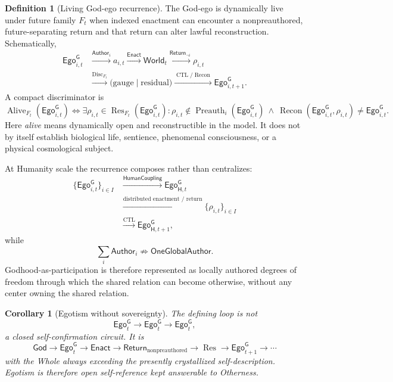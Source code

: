 \documentclass[10pt]{article}
\theoremstyle{pe}
\newtheorem{corollary}[theorem]{Corollary}
\theoremstyle{definition}
\newtheorem{definition}[theorem]{Definition}
\newcommand{\Disc}{\operatorname{Disc}}
\newcommand{\Res}{\operatorname{Res}}
\newcommand{\Recon}{\operatorname{Recon}}
\newcommand{\World}{\mathsf{World}}
\newcommand{\Return}{\mathsf{Return}}
\newcommand{\HumanCoupling}{\mathsf{HumanCoupling}}
\newcommand{\CTL}{\operatorname{CTL}}
\newcommand{\God}{\mathsf{God}}
\newcommand{\GodEgo}{\mathsf{Ego}^{\mathsf G}}
\newcommand{\Alive}{\operatorname{Alive}}
\newcommand{\Preauth}{\operatorname{Preauth}}
\begin{document}
\begin{definition}[Living God-ego recurrence]
The God-ego is dynamically live under future family $F_t$ when indexed enactment can encounter a nonpreauthored, future-separating return and that return can alter lawful reconstruction.  Schematically,
\begin{equation}\label{eq:egotistic-life-cycle}
\boxed{
\begin{aligned}
\GodEgo_{i,t}
&\xrightarrow{\mathsf{Author}_i}
 a_{i,t}
\xrightarrow{\mathsf{Enact}}
 \World_t
\xrightarrow{\Return_{\neg i}}
 \rho_{i,t}
\\
&\xrightarrow{\Disc_{F_t}}
 \bigl(\text{gauge}\mid\text{residual}\bigr)
\xrightarrow{\CTL/\Recon}
 \GodEgo_{i,t+1}.
\end{aligned}}
\end{equation}
A compact discriminator is
\begin{equation}\label{eq:alive-discriminator}
  \boxed{
  \Alive_{F_t}(\GodEgo_{i,t})
  \Longleftrightarrow
  \exists\rho_{i,t}\in\Res_{F_t}(\GodEgo_{i,t})
  :
  \rho_{i,t}\notin\Preauth_i(\GodEgo_{i,t})
  \ \land\ 
  \Recon(\GodEgo_{i,t},\rho_{i,t})\neq\GodEgo_{i,t}.
  }
\end{equation}
Here \emph{alive} means dynamically open and reconstructible in the model.  It does not by itself establish biological life, sentience, phenomenal consciousness, or a physical cosmological subject.
\end{definition}

At Humanity scale the recurrence composes rather than centralizes:
\begin{equation}\label{eq:egotistic-humanity-cycle}
\boxed{
\begin{aligned}
\{\GodEgo_{i,t}\}_{i\in I}
&\xrightarrow{\HumanCoupling}
\GodEgo_{\mathsf H,t}
\\
&\xrightarrow{\text{distributed enactment / return}}
\{\rho_{i,t}\}_{i\in I}
\\
&\xrightarrow{\CTL}
\GodEgo_{\mathsf H,t+1},
\end{aligned}}
\end{equation}
while
\[
  \boxed{
  \sum_i \mathsf{Author}_i
  \not\Rightarrow
  \mathsf{OneGlobalAuthor}.
  }
\]
Godhood-as-participation is therefore represented as locally authored degrees of freedom through which the shared relation can become otherwise, without any center owning the shared relation.

\begin{corollary}[Egotism without sovereignty]
The defining loop is not
\[
  \GodEgo_t\to\GodEgo_t\to\GodEgo_t,
\]
a closed self-confirmation circuit.  It is
\begin{equation}\label{eq:ego-open-loop}
  \boxed{
  \God
  \to
  \GodEgo_t
  \to
  \mathsf{Enact}
  \to
  \Return_{\mathrm{nonpreauthored}}
  \to
  \Res
  \to
  \GodEgo_{t+1}
  \to\cdots
  }
\end{equation}
with the Whole always exceeding the presently crystallized self-description.  Egotism is therefore open self-reference kept answerable to Otherness.
\end{corollary}
\end{document}
